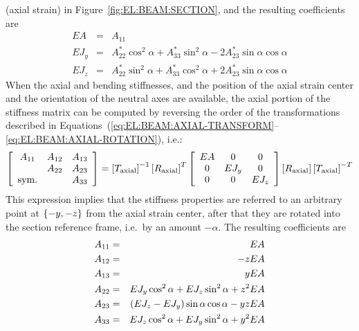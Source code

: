 (axial strain) in Figure~\ref{fig:EL:BEAM:SECTION},
and the resulting coefficients are
\begin{eqnarray}
	EA & = & A_{11} \\
	EJ_y & = & A_{22}^* \cos^2\alpha + A_{33}^* \sin^2\alpha
		- 2 A_{23}^* \sin\alpha \cos\alpha \\
	EJ_z & = & A_{22}^* \sin^2\alpha + A_{33}^* \cos^2\alpha
		+ 2 A_{23}^* \sin\alpha \cos\alpha
\end{eqnarray}
When the axial and bending stiffnesses, and the position 
of the axial strain center and the orientation of the neutral axes
are available, the axial portion of the stiffness matrix 
can be computed by reversing the order of the transformations 
described in
Equations~(\ref{eq:EL:BEAM:AXIAL-TRANSFORM}--\ref{eq:EL:BEAM:AXIAL-ROTATION}),
i.e.:
\begin{equation}
	\sqbr{\matr{ccc}{
		A_{11} & A_{12} & A_{13} \\
		& A_{22} & A_{23} \\
		\llk{sym.} & & A_{33}
	}} = \sqbr{T_{\llk{axial}}}^{-1} \sqbr{R_{\llk{axial}}}^T \sqbr{\matr{ccc}{
		EA & 0 & 0 \\
		0 & EJ_y & 0 \\
		0 & 0 & EJ_z
	}} \sqbr{R_{\llk{axial}}} \sqbr{T_{\llk{axial}}}^{-T}
	\label{eq:EL:BEAM:AXIAL-TRANSFORM-REVERSED}
\end{equation}
This expression implies that the stiffness properties are referred
to an arbitrary point at $\left\{ -y,-z \right\}$ from the axial strain center,
after that they are rotated into the section reference frame, 
i.e.\ by an amount $-\alpha$.
The resulting coefficients are
\begin{eqnarray*}
	A_{11} & = & EA \\
	A_{12} & = & -z EA \\
	A_{13} & = & y EA \\
	A_{22} & = & EJ_y \cos^2\alpha + EJ_z \sin^2\alpha + z^2 EA \\
	A_{23} & = & \left( EJ_z - EJ_y \right) \sin\alpha\cos\alpha - y z EA \\
	A_{33} & = & EJ_z \cos^2\alpha + EJ_y \sin^2\alpha + y^2 EA
\end{eqnarray*}



